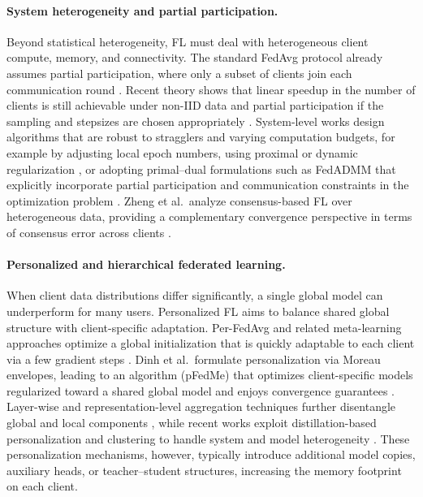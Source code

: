 \paragraph{System heterogeneity and partial participation.}
Beyond statistical heterogeneity, FL must deal with heterogeneous client compute, memory, and connectivity. The standard FedAvg protocol already assumes partial participation, where only a subset of clients join each communication round \cite{mcmahan2017communication}. Recent theory shows that linear speedup in the number of clients is still achievable under non-IID data and partial participation if the sampling and stepsizes are chosen appropriately \cite{yang2021linear}. System-level works design algorithms that are robust to stragglers and varying computation budgets, for example by adjusting local epoch numbers, using proximal or dynamic regularization \cite{sahu2018fedprox,acar2021feddyn}, or adopting primal--dual formulations such as FedADMM that explicitly incorporate partial participation and communication constraints in the optimization problem \cite{wang2022fedadmm}. Zheng et al.\ analyze consensus-based FL over heterogeneous data, providing a complementary convergence perspective in terms of consensus error across clients \cite{zheng2023consensusFL}.

\paragraph{Personalized and hierarchical federated learning.}
When client data distributions differ significantly, a single global model can underperform for many users. Personalized FL aims to balance shared global structure with client-specific adaptation. Per-FedAvg and related meta-learning approaches optimize a global initialization that is quickly adaptable to each client via a few gradient steps \cite{zhang2020perfedavg}. Dinh et al.\ formulate personalization via Moreau envelopes, leading to an algorithm (pFedMe) that optimizes client-specific models regularized toward a shared global model and enjoys convergence guarantees \cite{dinh2020pfedme}. Layer-wise and representation-level aggregation techniques further disentangle global and local components \cite{ma2022layerwise}, while recent works exploit distillation-based personalization and clustering to handle system and model heterogeneity \cite{chen2024spectralcodistill,xie2024MHpFLID}. These personalization mechanisms, however, typically introduce additional model copies, auxiliary heads, or teacher--student structures, increasing the memory footprint on each client.


